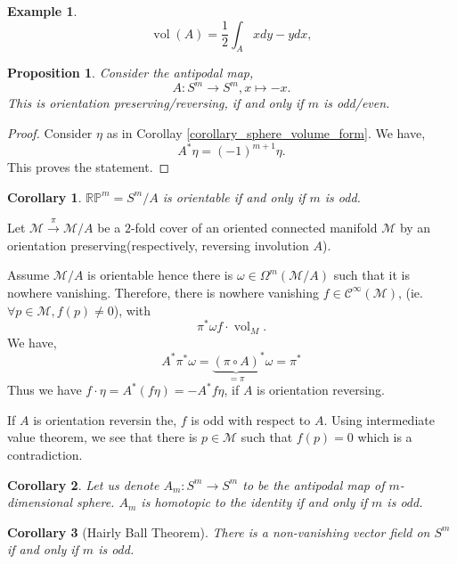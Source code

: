 \documentclass[8pt]{article}
\newtheorem{proposition}{Proposition}[section]
\newtheorem{corollary}{Corollary} [section]
\newtheorem{example}{Example}[section]
\DeclareMathOperator{\vol}{vol}
\newcommand{\R}[0]{\mathbb{R}}
\newcommand{\M}[0]{\mathcal{M}}
\newcommand{\cinf}[0]{\mathcal{C}^\infty}
\begin{document}
\begin{example}
  \begin{equation*}
  \vol(A) = {\frac 1 2}\int_A xdy-ydx, 
  \end{equation*}
\end{example}
\begin{proposition}
  Consider the antipodal map,
  \begin{equation*}
    A:S^m\to S^m, x\mapsto -x.
  \end{equation*}
This is orientation preserving/reversing, if and only if $m$ is odd/even.
\end{proposition}
\begin{proof}
  Consider $\eta$ as in Corollay \ref{corollary_sphere_volume_form}. We have,
  \begin{equation*}
    A^*\eta  = (-1)^{m+1}\eta.
  \end{equation*}
  This proves the statement.
\end{proof}
\begin{corollary}
  $\R\mathbb{P}^m = S^m/A$ is orientable if and only if $m$ is odd. 
\end{corollary}
Let $\M\stackrel{\pi}{\to}\M/A$ be a $2$-fold cover of an oriented connected manifold $\M$ by an orientation preserving(respectively, reversing involution $A$). 
\par Assume $\M/A$ is orientable hence there is $\omega\in\Omega^m(\M/A)$ such that it is nowhere vanishing. Therefore, there is nowhere vanishing $f\in\cinf(\M)$, (ie. $\forall p\in \M,f(p)\not=0$), with
\begin{equation*}
  \pi^*\omega f\cdot \vol_M.
\end{equation*}
We have,
\begin{equation*}
  A^*\pi^*\omega = {\underbrace{(\pi\circ A)}_{=\pi}}^*\omega = \pi^*
\end{equation*}
Thus we have $f\cdot\eta = A^*(f\eta)=-A^*f\eta$, if $A$ is orientation reversing.
\par If $A$ is orientation reversin the, $f$ is odd with respect to $A$. Using intermediate value theorem, we see that there is $p\in \M$ such that $f(p)=0$ which is a contradiction.
\begin{corollary}
  \label{lemma_antipodal_homotopic}
  Let us denote $A_m:S^m\to S^m$ to be the antipodal map of $m$-dimensional sphere. $A_m$ is homotopic to the identity if and only if $m$ is odd. 
\end{corollary}
\begin{corollary}[Hairly Ball Theorem]
  There is a non-vanishing vector field on $S^m$ if and only if $m$ is odd.
\end{corollary}
\end{document}
